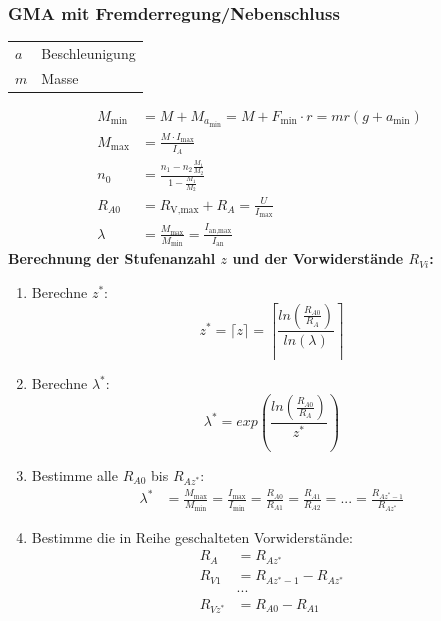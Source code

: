 \documentclass[a4paper,twocolumn,10pt]{article}
\begin{document}
\subsubsection{GMA mit Fremderregung/Nebenschluss}
\begin{tabular}{ll}
$a$ & Beschleunigung\\
$m$ & Masse
\end{tabular}
\begin{equation*}
\begin{split}
M_{\text{min}}&=M+M_{a_\text{min}}=M+ F_{\text{min}}\cdot r=mr(g+a_{\text{min}})\\
M_{\text{max}}&=\frac{M\cdot I_{\text{max}}}{I_A}\\
n_0&=\frac{n_1-n_2\frac{M_1}{M_2}}{1-\frac{M_1}{M_2}}\\
R_{A0}&=R_{\text{V,max}}+R_A=\frac{U}{I_{\text{max}}}\\
\lambda&=\frac{M_{\text{max}}}{M_{\text{min}}}=\frac{I_{\text{an,max}}}{I_{\text{an}}}
\end{split}
\end{equation*}
\textbf{Berechnung der Stufenanzahl $z$ und der Vorwiderstände $R_{Vi}$:}
\begin{enumerate}
\item Berechne $z^*$:
\begin{equation*}
z^*=\lceil z\rceil=\left\lceil\frac{ln\left(\frac{R_{A0}}{R_A}\right)}{ln(\lambda)}\right\rceil
\end{equation*}
\item Berechne $\lambda^*$:
\begin{equation*}
\lambda^*=exp\left(\frac{ln\left(\frac{R_{A0}}{R_A}\right)}{z^*}\right)
\end{equation*}
\item Bestimme alle $R_{A0}$ bis $R_{Az^*}$:
\begin{equation*}
\begin{split}
\lambda^*&=\frac{M_{\text{max}}}{M_{\text{min}}}=\frac{I_{\text{max}}}{I_{\text{min}}}=\frac{R_{A0}}{R_{A1}}=\frac{R_{A1}}{R_{A2}}=...=\frac{R_{Az^*-1}}{R_{Az^*}}
\end{split}
\end{equation*}
\item Bestimme die in Reihe geschalteten Vorwiderstände:
\begin{equation*}
\begin{split}
R_A&=R_{Az^*}\\
R_{V1}&=R_{Az^*-1}-R_{Az^*}\\
&...\\
R_{Vz^*}&=R_{A0}-R_{A1}
\end{split}
\end{equation*}
\end{enumerate}
\end{document}
